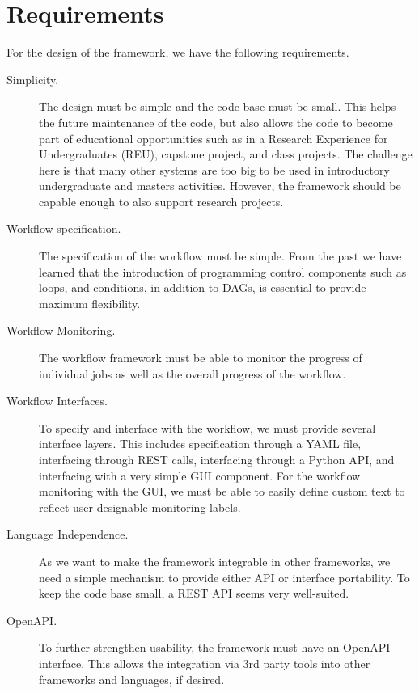 \documentclass[sigplan,screen]{acmart}
\newcommand{\FILE}[1]{}
\begin{document}
\FILE{requirements.tex}

\section{Requirements}

For the design of the framework, we have the following requirements.

\begin{description}

\item[Simplicity.] The design must be simple and the code base must be
small.  This helps the future maintenance of the code, but also allows
the code to become part of educational opportunities such as in a
Research Experience for Undergraduates (REU), capstone project, and
class projects. The challenge here is that many other systems are too
big to be used in introductory undergraduate and masters activities.
However, the framework should be capable enough to also support
research projects.

\item[Workflow specification.] The specification of the workflow must
be simple.  From the past we have learned that the introduction of
programming control components such as loops, and conditions, in
addition to DAGs, is essential to provide maximum flexibility.

\item[Workflow Monitoring.] The workflow framework must be able to
monitor the progress of individual jobs as well as the overall
progress of the workflow.

\item[Workflow Interfaces.] To specify and interface with the
workflow, we must provide several interface layers. This includes
specification through a YAML file, interfacing through REST calls,
interfacing through a Python API, and interfacing with a very simple
GUI component.  For the workflow monitoring with the GUI, we must be
able to easily define custom text to reflect user designable
monitoring labels.

\item[Language Independence.] As we want to make the framework
integrable in other frameworks, we need a simple mechanism to provide
either API or interface portability. To keep the code base small, a
REST API seems very well-suited.

\item[OpenAPI.] To further strengthen usability, the framework must
have an OpenAPI interface. This allows the integration via 3rd party
tools into other frameworks and languages, if desired.


\end{description}
\end{document}
